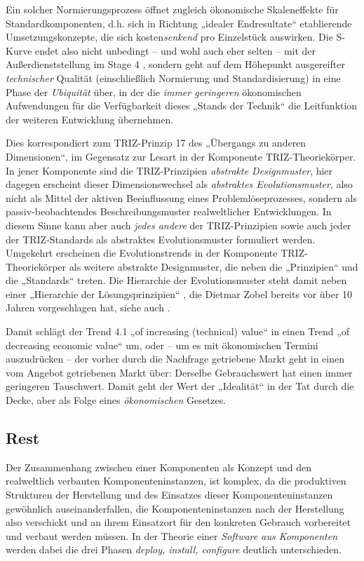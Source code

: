 \documentclass[11pt,a4paper]{article}
\begin{document}
Ein solcher Normierungsprozess öffnet zugleich ökonomische Skaleneffekte für
Standardkomponenten, d.h. sich in Richtung „idealer Endresultate“ etablierende
Umsetzungskonzepte, die sich kosten\emph{senkend} pro Einzelstück auswirken.
Die S-Kurve endet also nicht unbedingt -- und wohl auch eher selten -- mit der
Außerdienststellung im Stage 4 \cite[S. 38]{TESE2018}, sondern geht auf dem
Höhepunkt ausgereifter \emph{technischer} Qualität (einschließlich Normierung
und Standardisierung) in eine Phase der \emph{Ubiquität} über, in der die
\emph{immer geringeren} ökonomischen Aufwendungen für die Verfügbarkeit dieses
„Stands der Technik“ die Leitfunktion der weiteren Entwicklung übernehmen.

Dies korrespondiert zum TRIZ-Prinzip 17 des „Übergangs zu anderen
Dimensionen“, im Gegensatz zur Lesart in der Komponente TRIZ-Theoriekörper.
In jener Komponente sind die TRIZ-Prinzipien \emph{abstrakte Designmuster},
hier dagegen erscheint dieser Dimensionswechsel als \emph{abstraktes
  Evolutionsmuster}, also nicht als Mittel der aktiven Beeinflussung eines
Problemlöseprozesses, sondern als passiv-beobachtendes Beschreibungsmuster
realweltlicher Entwicklungen.  In diesem Sinne kann aber auch \emph{jedes
  andere} der TRIZ-Prinzipien sowie auch jeder der TRIZ-Standards als
abstraktes Evolutionsmuster formuliert werden. Umgekehrt erscheinen die
Evolutionstrends in der Komponente TRIZ-Theoriekörper als weitere abstrakte
Designmuster, die neben die „Prinzipien“ und die „Standards“ treten.  Die
Hierarchie der Evolutionsmuster steht damit neben einer „Hierarchie der
Lösungsprinzipien“ \cite[Kap. 3]{Zobel2016}, die Dietmar Zobel bereits vor
über 10 Jahren vorgeschlagen hat, siehe auch \cite{Zobel2020}. 

Damit schlägt der Trend 4.1 „of increasing (technical) value“ in einen Trend
„of decreasing economic value“ um, oder -- um es mit ökonomischen Termini
auszudrücken -- der vorher durch die Nachfrage getriebene Markt geht in einen
vom Angebot getriebenen Markt über: Derselbe Gebrauchswert hat einen immer
geringeren Tauschwert.  Damit geht der Wert der „Idealität“
\cite[Kap. 4.1.1]{KS2017} in der Tat durch die Decke, aber als Folge eines
\emph{ökonomischen} Gesetzes.


\subsection{Rest}


Der Zusammenhang zwischen einer Komponenten als Konzept und den realweltlich
verbauten Komponenteninstanzen, ist komplex, da die produktiven Strukturen der
Herstellung und des Einsatzes dieser Komponenteninstanzen gewöhnlich
auseinanderfallen, die Komponenteninstanzen nach der Herstellung also
verschickt und an ihrem Einsatzort für den konkreten Gebrauch vorbereitet und
verbaut werden müssen. In der Theorie einer \emph{Software aus Komponenten}
werden dabei die drei Phasen \emph{deploy, install, configure} deutlich
unterschieden.
\end{document}
